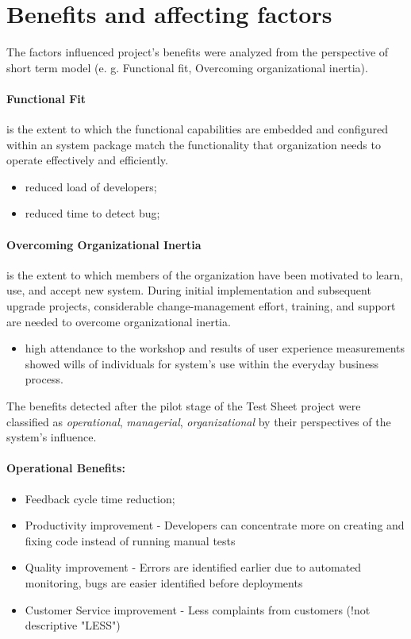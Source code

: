 \section{Benefits and affecting factors}
The factors influenced project's benefits were analyzed from the perspective of short term model (e. g. Functional fit, Overcoming organizational inertia).
\paragraph{Functional Fit} is the extent to which the functional capabilities are embedded and configured within an system package match the functionality that organization needs to operate effectively and efficiently.
\begin{itemize}
	\item reduced load of developers;
	\item reduced time to detect bug;
\end{itemize}

\paragraph{Overcoming Organizational Inertia} is the extent to which members of the organization have been motivated to learn, use, and accept new system. During initial implementation and subsequent upgrade projects, considerable change-management effort, training, and support are needed to overcome organizational inertia.
\begin{itemize}
	\item high attendance to the workshop and  results of user experience measurements showed wills of individuals for system's use within the everyday business process.
\end{itemize}

The benefits detected after the pilot stage of the Test Sheet project were classified  as \textit{operational}, \textit{managerial}, \textit{organizational} by their perspectives of the system's influence.

\paragraph{Operational Benefits:}
\begin{itemize}
	\item Feedback cycle time reduction;
	\item Productivity improvement - Developers can concentrate more on creating and fixing code instead of running manual tests
	\item Quality improvement - Errors are identified earlier due to automated monitoring, bugs are easier identified before deployments
	\item Customer Service improvement - Less complaints from customers (!not descriptive "LESS")
\end{itemize}

